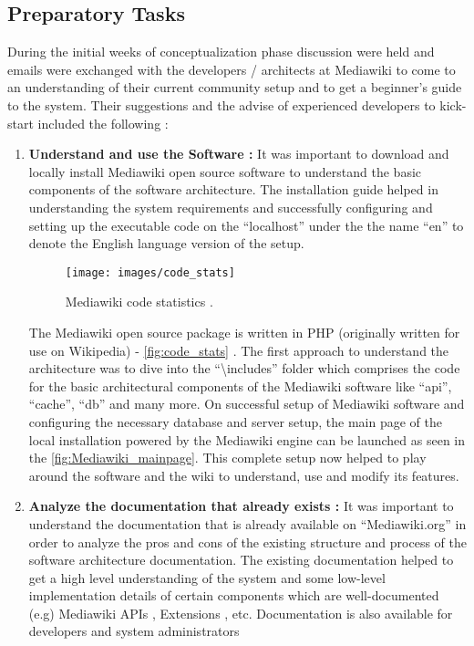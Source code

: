 \subsection{Preparatory Tasks}
\indent During the initial weeks of conceptualization phase discussion were held and emails were exchanged with the developers / architects at Mediawiki to come to an understanding of their current community setup and to get a beginner's guide to the system. Their suggestions and the advise of experienced developers to kick-start included the following :
\begin{enumerate}
\item \textbf{Understand and use the Software : } It was important to download and locally install Mediawiki open source software to understand the basic components of the software architecture. The installation guide \cite{Installation_guide} helped in understanding the system requirements and successfully configuring and setting up the executable code on the \enquote{localhost} under the the name \enquote{en} to denote the English language version of the setup. 
\begin{figure}[H]
  \centering
  \texttt{[image: images/code\_stats]}
  \caption[Mediawiki code statistics \cite{openhub_MW}]{Mediawiki code statistics \cite{openhub_MW}.}\label{fig:code_stats}
\end{figure}
The Mediawiki open source package is written in PHP (originally written for use on Wikipedia) - \autoref{fig:code_stats} \cite{openhub_MW}. The first approach to understand the architecture was to dive into the \enquote{\textbackslash{includes}} folder which comprises the code for the basic architectural components of the Mediawiki software like \enquote{api}, \enquote{cache}, \enquote{db} and many more. 
\indent On successful setup of Mediawiki software and configuring the necessary database and server setup, the main page of the local installation powered by the Mediawiki engine can be launched as seen in the \autoref{fig:Mediawiki_mainpage}.
This complete setup now helped to play around the software and the wiki to understand, use and modify its features.
\item \textbf{Analyze the documentation that already exists : } It was important to understand the documentation that is already available on \enquote{Mediawiki.org} in order to analyze the pros and cons of the existing structure and process of the software architecture documentation. The existing documentation helped to get a high level understanding of the system and some low-level implementation details of certain components which are well-documented (e.g) Mediawiki APIs \cite{api_tutorial}, Extensions \cite{manual_extensions}, etc. Documentation is also available for developers and system administrators \cite{MW_doc}

\end{enumerate}
